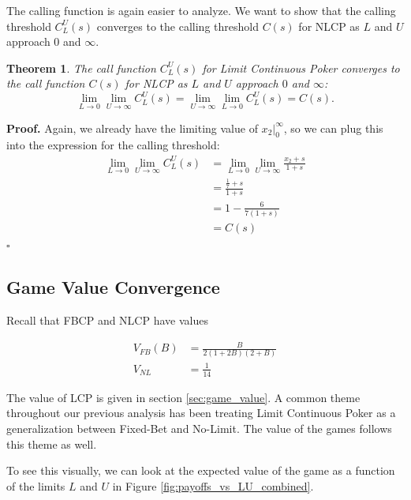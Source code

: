 \documentclass[a4paper,12pt]{article}
\theoremstyle{plain}
\newtheorem{theorem}{Theorem}[section]
\theoremstyle{definition}
\newenvironment{customproof}[1][Proof]{\noindent\textbf{#1.} }{\hfill$\square$\vspace{1em}}
\begin{document}
The calling function is again easier to analyze. We want to show that the calling threshold $C_L^U(s)$ converges to the calling threshold $C(s)$ for NLCP as $L$ and $U$ approach $0$ and $\infty$.
\begin{theorem}
    The call function $C_L^U(s)$ for Limit Continuous Poker converges to the call function $C(s)$ for NLCP as $L$ and $U$ approach $0$ and $\infty$:
\[
\lim_{L \to 0} \lim_{U \to \infty} C_L^U(s) = \lim_{U \to \infty} \lim_{L \to 0} C_L^U(s) = C(s).
\]
\end{theorem}
\begin{customproof}
Again, we already have the limiting value of $x_2|_0^\infty$, so we can plug this into the expression for the calling threshold:
\begin{align*}
    \lim_{L \to 0} \lim_{U \to \infty} C_L^U(s) & = \lim_{L \to 0} \lim_{U \to \infty} \frac{x_2+s}{1+s}\\
    & = \frac{\frac{1}{7}+s}{1+s}\\
    & = 1 - \frac{6}{7(1+s)}\\
    & = C(s)
\end{align*}
\end{customproof}


\subsection{Game Value Convergence}
\label{sec:game_value_convergence}

Recall that FBCP and NLCP have values

\begin{align*}
    V_{FB}(B) &= \frac{B}{2(1+2B)(2+B)} \\
    V_{NL} & = \frac{1}{14}
\end{align*}

The value of LCP is given in section \ref{sec:game_value}. A common theme throughout our previous analysis has been treating Limit Continuous Poker as a generalization between Fixed-Bet and No-Limit. The value of the games follows this theme as well.

To see this visually, we can look at the expected value of the game as a function of the limits $L$ and $U$ in Figure \ref{fig:payoffs_vs_LU_combined}.
\end{document}

